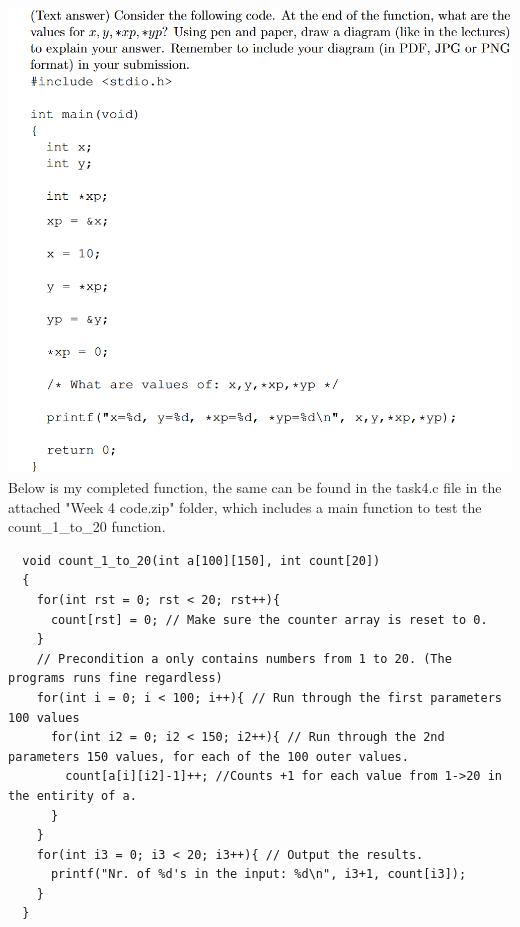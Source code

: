 \documentclass{article}
\begin{document}
\section{}
\includegraphics[width=\linewidth, keepaspectratio=true]{task4}
\vspace{2pt}\\
Below is my completed function, the same can be found in the task4.c file in the attached "Week 4 code.zip" folder, which includes a main function to test the count\_1\_to\_20 function.
\begin{lstlisting}
  void count_1_to_20(int a[100][150], int count[20]) 
  {	
    for(int rst = 0; rst < 20; rst++){
      count[rst] = 0; // Make sure the counter array is reset to 0.
    }
    // Precondition a only contains numbers from 1 to 20. (The programs runs fine regardless)
    for(int i = 0; i < 100; i++){ // Run through the first parameters 100 values
      for(int i2 = 0; i2 < 150; i2++){ // Run through the 2nd parameters 150 values, for each of the 100 outer values.
        count[a[i][i2]-1]++; //Counts +1 for each value from 1->20 in the entirity of a.
      }
    }
    for(int i3 = 0; i3 < 20; i3++){ // Output the results.
      printf("Nr. of %d's in the input: %d\n", i3+1, count[i3]); 
    }
  }
\end{lstlisting}
\pagebreak
\end{document}
